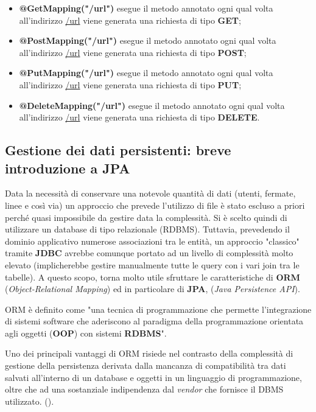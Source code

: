         \begin{itemize}
            \item \textbf{@GetMapping("/url")} esegue il metodo annotato ogni qual volta all'indirizzo \url{/url} viene generata una richiesta di tipo \textbf{GET};
            \item \textbf{@PostMapping("/url")} esegue il metodo annotato ogni qual volta all'indirizzo \url{/url} viene generata una richiesta di tipo \textbf{POST};
            \item \textbf{@PutMapping("/url")} esegue il metodo annotato ogni qual volta all'indirizzo \url{/url} viene generata una richiesta di tipo \textbf{PUT};
            \item \textbf{@DeleteMapping("/url")} esegue il metodo annotato ogni qual volta all'indirizzo \url{/url} viene generata una richiesta di tipo \textbf{DELETE}.
        \end{itemize}

    \subsection{Gestione dei dati persistenti: breve introduzione a JPA}
        Data la necessità di conservare una notevole quantità di dati (utenti, fermate, linee e così via) un approccio che prevede l'utilizzo di file è stato escluso a priori perché quasi impossibile da gestire data la complessità. Si è scelto quindi di utilizzare un database di tipo relazionale (RDBMS). Tuttavia, prevedendo il dominio applicativo numerose associazioni tra le entità, un approccio "classico" tramite \textbf{JDBC} avrebbe comunque portato ad un livello di complessità molto elevato (implicherebbe gestire manualmente tutte le query con i vari join tra le tabelle). A questo scopo, torna molto utile sfruttare le caratteristiche di \textbf{ORM} (\textit{Object-Relational Mapping}) ed in particolare di \textbf{JPA}, (\textit{Java Persistence API}).
        
        ORM è definito come "una tecnica di programmazione che permette l'integrazione di sistemi software che aderiscono al paradigma della programmazione orientata agli oggetti (\textbf{OOP}) con sistemi \textbf{RDBMS}".

        Uno dei principali vantaggi di ORM risiede nel contrasto della complessità di gestione della persistenza derivata dalla mancanza di compatibilità tra dati salvati all'interno di un database e oggetti in un linguaggio di programmazione, oltre che ad una sostanziale indipendenza dal \textit{vendor} che fornisce il DBMS utilizzato. (\cite{wiki:orm}).
        

